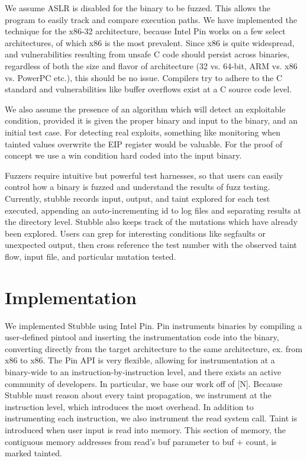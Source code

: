\documentclass[11pt,expanded,copyright]{fsuthesis}
\begin{document}
We assume ASLR is disabled for the binary to be fuzzed. This allows the program to easily track and compare execution paths. We have implemented the technique for the x86-32 architecture, because Intel Pin works on a few select architectures, of which x86 is the most prevalent. Since x86 is quite widespread, and vulnerabilities resulting from unsafe C code should persist across binaries, regardless of both the size and flavor of architecture (32 vs. 64-bit, ARM vs. x86 vs. PowerPC etc.), this should be no issue. Compilers try to adhere to the C standard and vulnerabilities like buffer overflows exist at a C source code level. 

We also assume the presence of an algorithm which will detect an exploitable condition, provided it is given the proper binary and input to the binary, and an initial test case. For detecting real exploits, something like monitoring when tainted values overwrite the EIP register would be valuable. For the proof of concept we use a win condition hard coded into the input binary.

Fuzzers require intuitive but powerful test harnesses, so that users can easily control how a binary is fuzzed and understand the results of fuzz testing. Currently, stubble records input, output, and taint explored for each test executed, appending an auto-incrementing id to log files and separating results at the directory level. Stubble also keeps track of the mutations which have already been explored. Users can grep for interesting conditions like segfaults or unexpected output, then cross reference the test number with the observed taint flow, input file, and particular mutation tested.


\section{Implementation}


We implemented Stubble using Intel Pin. Pin instruments binaries by compiling a user-defined pintool and inserting the instrumentation code into the binary, converting directly from the target architecture to the same architecture, ex. from x86 to x86. The Pin API is very flexible, allowing for instrumentation at a binary-wide to an instruction-by-instruction level, and there exists an active community of developers. In particular, we base our work off of [N]. Because Stubble must reason about every taint propagation, we instrument at the instruction level, which introduces the most overhead. In addition to instrumenting each instruction, we also instrument the read system call. Taint is introduced when user input is read into memory. This section of memory, the contiguous memory addresses from read's buf parameter to buf + count, is marked tainted. 
\end{document}
